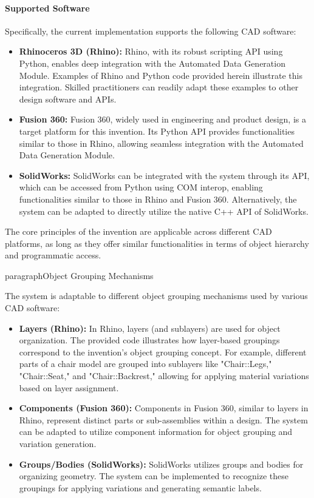 \documentclass[12pt]{report}
\begin{document}
\paragraph{Supported Software}
Specifically, the current implementation supports the following CAD software:

\begin{itemize}
    \item \textbf{Rhinoceros 3D (Rhino):} Rhino, with its robust scripting API using Python, enables deep integration with the Automated Data Generation Module. Examples of Rhino and Python code provided herein illustrate this integration. Skilled practitioners can readily adapt these examples to other design software and APIs.
    \item \textbf{Fusion 360:} Fusion 360, widely used in engineering and product design, is a target platform for this invention. Its Python API provides functionalities similar to those in Rhino, allowing seamless integration with the Automated Data Generation Module.
    \item \textbf{SolidWorks:} SolidWorks can be integrated with the system through its API, which can be accessed from Python using COM interop, enabling functionalities similar to those in Rhino and Fusion 360. Alternatively, the system can be adapted to directly utilize the native C++ API of SolidWorks.
\end{itemize}

The core principles of the invention are applicable across different CAD platforms, as long as they offer similar functionalities in terms of object hierarchy and programmatic access.

paragraph{Object Grouping Mechanisms}

The system is adaptable to different object grouping mechanisms used by various CAD software:

\begin{itemize}
    \item \textbf{Layers (Rhino):} In Rhino, layers (and sublayers) are used for object organization. The provided code illustrates how layer-based groupings correspond to the invention's object grouping concept. For example, different parts of a chair model are grouped into sublayers like  "Chair::Legs," "Chair::Seat," and "Chair::Backrest," allowing for applying material variations based on layer assignment.

    \item \textbf{Components (Fusion 360):} Components in Fusion 360, similar to layers in Rhino, represent distinct parts or sub-assemblies within a design. The system can be adapted to utilize component information for object grouping and variation generation.

    \item \textbf{Groups/Bodies (SolidWorks):} SolidWorks utilizes groups and bodies for organizing geometry. The system can be implemented to recognize these groupings for applying variations and generating semantic labels.
\end{itemize}
\end{document}
